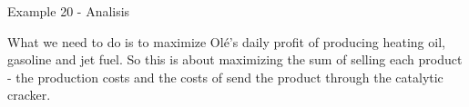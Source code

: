 \begin{frame}{Example 20 - Analisis}

What we need to do is to maximize Olé's daily profit of producing
heating oil, gasoline and jet fuel. So this is about maximizing the sum of
selling each product - the production costs and the costs of send
the product through the catalytic cracker.
\end{frame}

